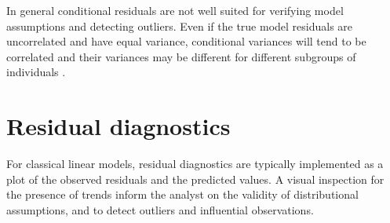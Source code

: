\documentclass[12pt, a4paper]{report}
\theoremstyle{plain}
\theoremstyle{definition}
\theoremstyle{remark}
\begin{document}
		In general conditional residuals are not well suited for verifying model assumptions and detecting outliers. Even if the true model residuals are uncorrelated and have equal variance, conditional variances will tend to be correlated and their variances may be different for different subgroups of individuals \citep{west}.

	

	
	
	
	

	
	\section{Residual diagnostics} %
	For classical linear models, residual diagnostics are typically implemented as a plot of the observed residuals and the predicted values. A visual inspection for the presence of trends inform the analyst on the validity of distributional assumptions, and to detect outliers and influential observations.
	
	
	
	
	
	
	
	
	
%	
%	
%	
%	
%	
%	
%	
	
\end{document}
